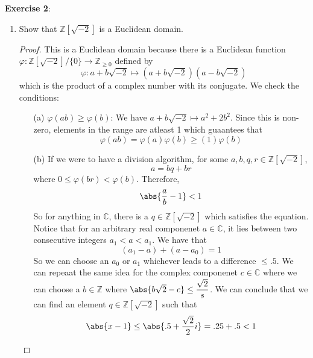 \documentclass{article}
\begin{document}
\textbf{Exercise 2}:
\begin{enumerate}
	\item Show that $\mathbb{Z}[\sqrt{-2}]$ is a Euclidean domain.
		\begin{proof}
			This is a Euclidean domain because there is a Euclidean function $\varphi : \mathbb{Z}[\sqrt{-2}]/\{0\} \rightarrow \mathbb{Z}_{\geq 0}$ defined by 
			\begin{equation*}
				\varphi : a + b\sqrt{-2} \mapsto (a + b\sqrt{-2})(a - b\sqrt{-2})
			\end{equation*}
			which is the product of a complex number with its conjugate. We check the conditions:
			\begin{enumerate}
				\item [(a)] $\varphi(ab) \geq \varphi(b)$: We have $a + b\sqrt{-2}\mapsto a^{2} + 2b^{2}$. Since this is non-zero, elements in the range are atleast 1 which guaantees that 
					\begin{equation*}
						\varphi(ab) = \varphi(a)\varphi(b) \geq (1)\varphi(b)
					\end{equation*}

			\item [(b)] If we were to have a division algorithm, for some $a, b, q, r \in \mathbb{Z}[\sqrt{-2}]$, 
				\begin{equation*}
					a = bq + br
				\end{equation*}
				where $0 \leq \varphi(br) < \varphi(b)$. Therefore, 
				\begin{equation*}
					\abs{\dfrac{a}{b} - 1} < 1
				\end{equation*}
				So for anything in $\mathbb{C}$, there is a $q \in \mathbb{Z}[\sqrt{-2}]$ which satisfies the equation. Notice that for an arbitrary real componenet $a \in \mathbb{C}$, it lies between two consecutive integers $a_{1} < a < a_{1}$. We have that 
				\begin{equation*}
					(a_{1} - a) + (a - a_{0}) = 1
				\end{equation*}
				So we can choose an $a_{0}$ or $a_{1}$ whichever leads to a difference $\leq .5$. We can repeaat the same idea for the complex componenet $c \in \mathbb{C}$ where we can choose a $b \in \mathbb{Z}$ where $\abs{b\sqrt{2} - c} \leq \dfrac{\sqrt{2}}{s}$. We can conclude that we can find an element $q \in \mathbb{Z}[\sqrt{-2}]$ such that 
				\begin{equation*}
					\abs{x - 1} \leq \abs{.5 + \dfrac{\sqrt{2}}{2}i} = .25 + .5 < 1
				\end{equation*}
			\end{enumerate}
		\end{proof}


\end{enumerate}
\end{document}
